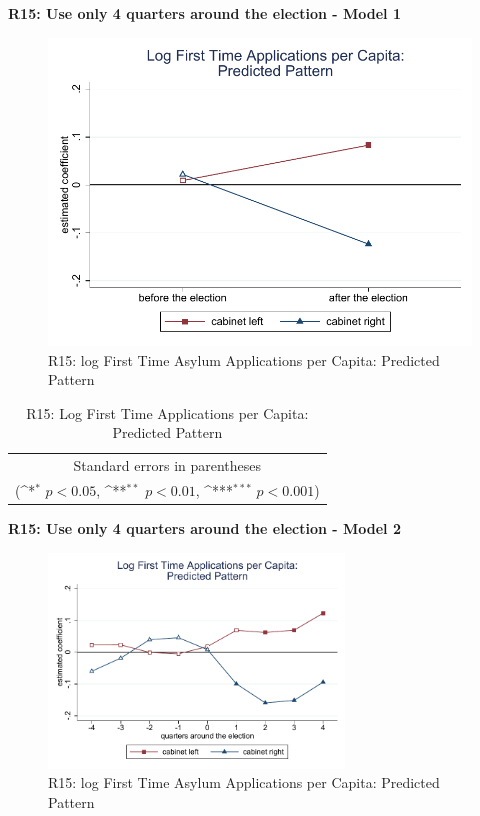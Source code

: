 \documentclass[10pt,a4paper]{scrartcl}
\begin{document}
\clearpage
\textbf{R15: Use only 4 quarters around the election - Model 1}
\begin{figure}[!ht]
	\centering
	\includegraphics[width=1\textwidth]{figures_edited/app_graph1_R15.pdf}
	\caption{R15: log First Time Asylum Applications per Capita: Predicted Pattern}
\end{figure}

\begin{table}[!ht]\centering
	\renewcommand{\arraystretch}{1.25}
	\def\sym#1{\ifmmode^{#1}\else\(^{#1}\)\fi}
	\caption{R15: Log First Time Applications per Capita: Predicted Pattern}
	\begin{tabular}{l*{2}{c}}
		\hline\hline
		
		\hline\hline
		\multicolumn{3}{c}{\footnotesize Standard errors in parentheses} \\
		\multicolumn{3}{c}{\footnotesize (\sym{*} \(p<0.05\), \sym{**} \(p<0.01\), \sym{***} \(p<0.001\))}\\
	\end{tabular}
\end{table}

\clearpage
\textbf{R15: Use only 4 quarters around the election - Model 2}
\begin{figure}[!ht]
	\centering
	\includegraphics[width=0.7\textwidth]{figures_edited/app_graph2_R15.pdf}
	\caption{R15: log First Time Asylum Applications per Capita: Predicted Pattern}
\end{figure}
\end{document}
